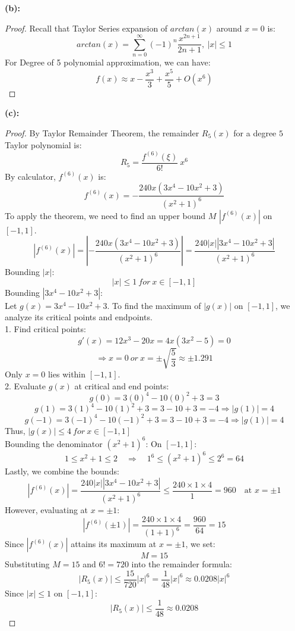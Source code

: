 \documentclass{article}
\begin{document}
\textbf{(b): }
\\
\begin{proof}
    Recall that Taylor Series expansion of $arctan(x)$ around $x = 0$ is:
    \[ arctan(x) = \sum_{n = 0}^{\infty} (-1)^n \frac{x^{2n + 1}}{2n + 1}, \ |x| \leq 1 \]
    For Degree of 5 polynomial approximation, we can have:
    \[ f(x) \approx x - \frac{x^3}{3} + \frac{x^5}{5} + O(x^6) \]
\end{proof}

\textbf{(c): }
\\
\begin{proof}
By Taylor Remainder Theorem, the remainder $R_{5}(x)$ for a degree $5$ Taylor polynomial is:
\[ R_5 = \frac{f^{(6)}(\xi)}{6!} \ x^6 \]
By calculator, $f^{(6)}(x)$ is:
\[ f^{(6)}(x) = -\frac{240x(3x^4 -10x^2 + 3)}{(x^2 + 1)^6} \]
To apply the theorem, we need to find an upper bound $M$ $|f^{(6)}(x)|$ on $[-1, 1]$.
\[ |f^{(6)}(x)| = \left|-\frac{240x(3x^4 -10x^2 + 3)}{(x^2 + 1)^6} \right| = \frac{240|x||3x^4 -10x^2 + 3|}{(x^2 + 1)^6} \]
Bounding $|x|$: 
\[ |x| \leq 1 \ for \ x \in [-1, 1] \]
Bounding $|3x^4 -10x^2 + 3|$: 
\\
Let $g(x) = 3x^4 - 10x^2 + 3$. To find the maximum of $|g(x)|$ on $[-1,1]$, we analyze its critical points and endpoints.
\\
1. Find critical points:
\[ g'(x) = 12x^3 - 20x = 4x(3x^2 - 5) = 0 \]
\[ \Rightarrow x = 0 \ or \ x = \pm \sqrt{\frac{5}{3}} \approx \pm 1.291 \]
Only $x = 0$ lies within $[-1, 1]$.
\\
2. Evaluate $g(x)$ at critical and end points:
\[ g(0) = 3(0)^4 - 10(0)^2 + 3 = 3 \]
\[ g(1) = 3(1)^4 - 10(1)^2 + 3 = 3 - 10 + 3 = -4 \Rightarrow |g(1)| = 4 \]
\[ g(-1) = 3(-1)^4 - 10(-1)^2 + 3 = 3 - 10 + 3 = -4 \Rightarrow |g(1)| = 4 \]
Thus, \( |g(x)| \leq 4 \ for \ x \in [-1, 1] \)
\\
Bounding the denominator $(x^2 + 1)^6$:
On \([-1,1]\):
\[
1 \leq x^2 + 1 \leq 2 \quad \Rightarrow \quad 1^6 \leq (x^2 + 1)^6 \leq 2^6 = 64
\]
Lastly, we combine the bounds:
\[
|f^{(6)}(x)| = \frac{240|x||3x^4 -10x^2 + 3|}{(x^2 + 1)^6} \leq \frac{240 \times 1 \times 4}{1} = 960 \quad \text{at } x = \pm1
\]
However, evaluating at \( x = \pm1 \):
\[
|f^{(6)}(\pm1)| = \frac{240 \times 1 \times 4}{(1 + 1)^6} = \frac{960}{64} = 15
\]
Since \( |f^{(6)}(x)| \) attains its maximum at \( x = \pm1 \), we set:
\[
M = 15
\]
Substituting \( M = 15 \) and \( 6! = 720 \) into the remainder formula:
\[
|R_5(x)| \leq \frac{15}{720} |x|^6 = \frac{1}{48} |x|^6 \approx 0.0208 |x|^6
\]
Since \( |x| \leq 1 \) on \([-1,1]\):
\[
    |R_5(x)| \leq \frac{1}{48} \approx 0.0208
\]
\end{proof}
\end{document}
